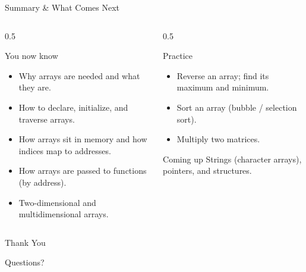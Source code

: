 \documentclass[aspectratio=169]{beamer}
\begin{document}
	\begin{frame}{Summary \& What Comes Next}
		\begin{columns}[T]
			\begin{column}{0.5\textwidth}
				\begin{block}{You now know}
					\begin{itemize}\small
						\item Why arrays are needed and what they are.
						\item How to declare, initialize, and traverse arrays.
						\item How arrays sit in memory and how indices map to addresses.
						\item How arrays are passed to functions (by address).
						\item Two-dimensional and multidimensional arrays.
					\end{itemize}
				\end{block}
			\end{column}
			\begin{column}{0.5\textwidth}
				\begin{block}{Practice}
					\begin{itemize}\small
						\item Reverse an array; find its maximum and minimum.
						\item Sort an array (bubble / selection sort).
						\item Multiply two matrices.
					\end{itemize}
				\end{block}
				\begin{block}{Coming up}
					\small Strings (character arrays), pointers, and structures.
				\end{block}
			\end{column}
		\end{columns}
	\end{frame}

	\begin{frame}
		\centering
		\Huge Thank You
		\vspace{0.5cm}

		\normalsize Questions?
	\end{frame}

\end{document}
